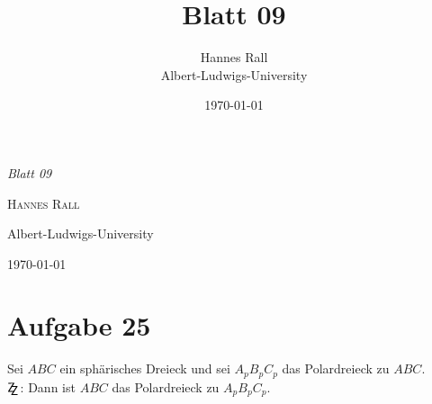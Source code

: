 \documentclass[12pt,a4paper]{article}
\title{Blatt 09}
\author{Hannes Rall \\ Albert-Ludwigs-University}
\date{\today}
\newcommand{\zz}{\stackinset{c}{2.5pt}{c}{-2.5pt}{\textsf{Z}}{\textsf{Z}}}
\begin{document}
\begin{titlepage}
    \centering
    \vspace*{2cm}
    {\Huge\itshape Blatt 09\par}
    \vspace{2cm}
    {\Large\textsc{Hannes Rall}\par}
    \vfill
    {\large Albert-Ludwigs-University\\}
    \vspace{1cm}
    {\large\today\par}
\end{titlepage}

\newpage
\section*{Aufgabe 25}
Sei $ABC$ ein sphärisches Dreieck und sei $A_pB_pC_p$ das Polardreieck zu $ABC$.\\
$\zz$ : Dann ist $ABC$ das Polardreieck zu $A_pB_pC_p$.
\end{document}
